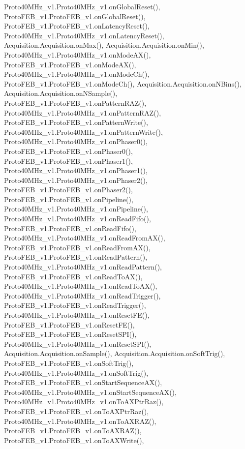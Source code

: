 Proto40\+M\+Hz\+\_\+v1.\+Proto40\+M\+Hz\+\_\+v1.\+on\+Global\+Reset(), Proto\+F\+E\+B\+\_\+v1.\+Proto\+F\+E\+B\+\_\+v1.\+on\+Global\+Reset(), Proto\+F\+E\+B\+\_\+v1.\+Proto\+F\+E\+B\+\_\+v1.\+on\+Latency\+Reset(), Proto40\+M\+Hz\+\_\+v1.\+Proto40\+M\+Hz\+\_\+v1.\+on\+Latency\+Reset(), Acquisition.\+Acquisition.\+on\+Max(), Acquisition.\+Acquisition.\+on\+Min(), Proto40\+M\+Hz\+\_\+v1.\+Proto40\+M\+Hz\+\_\+v1.\+on\+Mode\+A\+X(), Proto\+F\+E\+B\+\_\+v1.\+Proto\+F\+E\+B\+\_\+v1.\+on\+Mode\+A\+X(), Proto40\+M\+Hz\+\_\+v1.\+Proto40\+M\+Hz\+\_\+v1.\+on\+Mode\+Ch(), Proto\+F\+E\+B\+\_\+v1.\+Proto\+F\+E\+B\+\_\+v1.\+on\+Mode\+Ch(), Acquisition.\+Acquisition.\+on\+N\+Bins(), Acquisition.\+Acquisition.\+on\+N\+Sample(), Proto\+F\+E\+B\+\_\+v1.\+Proto\+F\+E\+B\+\_\+v1.\+on\+Pattern\+R\+A\+Z(), Proto40\+M\+Hz\+\_\+v1.\+Proto40\+M\+Hz\+\_\+v1.\+on\+Pattern\+R\+A\+Z(), Proto\+F\+E\+B\+\_\+v1.\+Proto\+F\+E\+B\+\_\+v1.\+on\+Pattern\+Write(), Proto40\+M\+Hz\+\_\+v1.\+Proto40\+M\+Hz\+\_\+v1.\+on\+Pattern\+Write(), Proto40\+M\+Hz\+\_\+v1.\+Proto40\+M\+Hz\+\_\+v1.\+on\+Phaser0(), Proto\+F\+E\+B\+\_\+v1.\+Proto\+F\+E\+B\+\_\+v1.\+on\+Phaser0(), Proto\+F\+E\+B\+\_\+v1.\+Proto\+F\+E\+B\+\_\+v1.\+on\+Phaser1(), Proto40\+M\+Hz\+\_\+v1.\+Proto40\+M\+Hz\+\_\+v1.\+on\+Phaser1(), Proto40\+M\+Hz\+\_\+v1.\+Proto40\+M\+Hz\+\_\+v1.\+on\+Phaser2(), Proto\+F\+E\+B\+\_\+v1.\+Proto\+F\+E\+B\+\_\+v1.\+on\+Phaser2(), Proto\+F\+E\+B\+\_\+v1.\+Proto\+F\+E\+B\+\_\+v1.\+on\+Pipeline(), Proto40\+M\+Hz\+\_\+v1.\+Proto40\+M\+Hz\+\_\+v1.\+on\+Pipeline(), Proto40\+M\+Hz\+\_\+v1.\+Proto40\+M\+Hz\+\_\+v1.\+on\+Read\+Fifo(), Proto\+F\+E\+B\+\_\+v1.\+Proto\+F\+E\+B\+\_\+v1.\+on\+Read\+Fifo(), Proto40\+M\+Hz\+\_\+v1.\+Proto40\+M\+Hz\+\_\+v1.\+on\+Read\+From\+A\+X(), Proto\+F\+E\+B\+\_\+v1.\+Proto\+F\+E\+B\+\_\+v1.\+on\+Read\+From\+A\+X(), Proto\+F\+E\+B\+\_\+v1.\+Proto\+F\+E\+B\+\_\+v1.\+on\+Read\+Pattern(), Proto40\+M\+Hz\+\_\+v1.\+Proto40\+M\+Hz\+\_\+v1.\+on\+Read\+Pattern(), Proto\+F\+E\+B\+\_\+v1.\+Proto\+F\+E\+B\+\_\+v1.\+on\+Read\+To\+A\+X(), Proto40\+M\+Hz\+\_\+v1.\+Proto40\+M\+Hz\+\_\+v1.\+on\+Read\+To\+A\+X(), Proto40\+M\+Hz\+\_\+v1.\+Proto40\+M\+Hz\+\_\+v1.\+on\+Read\+Trigger(), Proto\+F\+E\+B\+\_\+v1.\+Proto\+F\+E\+B\+\_\+v1.\+on\+Read\+Trigger(), Proto40\+M\+Hz\+\_\+v1.\+Proto40\+M\+Hz\+\_\+v1.\+on\+Reset\+F\+E(), Proto\+F\+E\+B\+\_\+v1.\+Proto\+F\+E\+B\+\_\+v1.\+on\+Reset\+F\+E(), Proto\+F\+E\+B\+\_\+v1.\+Proto\+F\+E\+B\+\_\+v1.\+on\+Reset\+S\+P\+I(), Proto40\+M\+Hz\+\_\+v1.\+Proto40\+M\+Hz\+\_\+v1.\+on\+Reset\+S\+P\+I(), Acquisition.\+Acquisition.\+on\+Sample(), Acquisition.\+Acquisition.\+on\+Soft\+Trig(), Proto\+F\+E\+B\+\_\+v1.\+Proto\+F\+E\+B\+\_\+v1.\+on\+Soft\+Trig(), Proto40\+M\+Hz\+\_\+v1.\+Proto40\+M\+Hz\+\_\+v1.\+on\+Soft\+Trig(), Proto\+F\+E\+B\+\_\+v1.\+Proto\+F\+E\+B\+\_\+v1.\+on\+Start\+Sequence\+A\+X(), Proto40\+M\+Hz\+\_\+v1.\+Proto40\+M\+Hz\+\_\+v1.\+on\+Start\+Sequence\+A\+X(), Proto40\+M\+Hz\+\_\+v1.\+Proto40\+M\+Hz\+\_\+v1.\+on\+To\+A\+X\+Ptr\+Raz(), Proto\+F\+E\+B\+\_\+v1.\+Proto\+F\+E\+B\+\_\+v1.\+on\+To\+A\+X\+Ptr\+Raz(), Proto40\+M\+Hz\+\_\+v1.\+Proto40\+M\+Hz\+\_\+v1.\+on\+To\+A\+X\+R\+A\+Z(), Proto\+F\+E\+B\+\_\+v1.\+Proto\+F\+E\+B\+\_\+v1.\+on\+To\+A\+X\+R\+A\+Z(), Proto\+F\+E\+B\+\_\+v1.\+Proto\+F\+E\+B\+\_\+v1.\+on\+To\+A\+X\+Write(), 